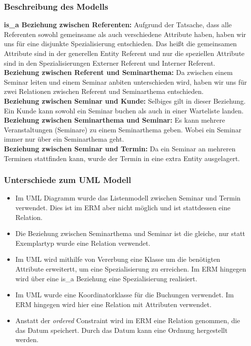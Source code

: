 \documentclass[10pt,a4paper]{article}
\begin{document}
\subsubsection{Beschreibung des Modells}

\textbf{is\_a Beziehung zwischen Referenten:} Aufgrund der Tatsache, dass alle Referenten sowohl gemeinsame als auch verschiedene Attribute haben, 
haben wir uns für eine disjunkte Spezialisierung entschieden. Das heißt die gemeinsamen Attribute sind in der 
generellen Entity Referent und nur die speziellen Attribute sind in den Spezialisierungen Externer Referent und
Interner Referent.
\\
\textbf{Beziehung zwischen Referent und Seminarthema:} Da zwischen einem Seminar leiten und einem Seminar anbiten 
unterschieden wird, haben wir uns für zwei Relationen zwischen Referent und Seminarthema entschieden.
\\
\textbf{Beziehung zwischen Seminar und Kunde:} Selbiges gilt in dieser Beziehung. Ein Kunde kann sowohl ein Seminar buchen 
als auch in einer Warteliste landen.
\\
\textbf{Beziehung zwischen Seminarthema und Seminar:} Es kann mehrere Veranstaltungen (Seminare) zu einem Seminarthema geben. Wobei ein Seminar immer nur über ein Seminarthema geht.
\\
\textbf{Beziehung zwischen Seminar und Termin:} Da ein Seminar an mehreren Terminen stattfinden kann, wurde der Termin in eine extra Entity ausgelagert.


\subsubsection{Unterschiede zum UML Modell}

\begin{itemize}

\item Im UML Diagramm wurde das Listenmodell zwischen Seminar und Termin verwendet. Dies ist im ERM aber nicht möglich und ist stattdessen eine Relation.
\item Die Beziehung zwischen Seminarthema und Seminar ist die gleiche, nur statt Exemplartyp wurde eine Relation verwendet.
\item Im UML wird mithilfe von Vererbung eine Klasse um die benötigten Attribute erweitertt, um eine Spezialisierung zu erreichen.
 Im ERM hingegen wird über eine is\_a Beziehung eine Spezialisierung realisiert.
\item Im UML wurde eine Koordinatorklasse für die Buchungen verwendet. Im ERM hingegen wird hier eine Relation mit Attributen verwendet.
\item Anstatt der \textit{ordered} Constraint wird im ERM eine Relation genommen, die das Datum speichert. Durch das Datum kann eine Ordnung hergestellt werden.

\end{itemize}
\end{document}
